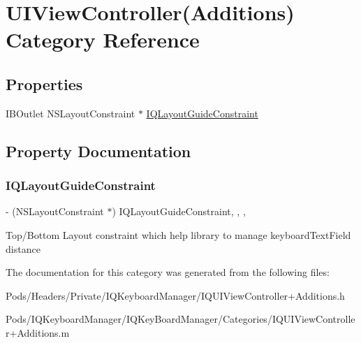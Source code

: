\hypertarget{category_u_i_view_controller_07_additions_08}{}\section{U\+I\+View\+Controller(Additions) Category Reference}
\label{category_u_i_view_controller_07_additions_08}
\subsection*{Properties}
\begin{DoxyCompactItemize}
\item 
I\+B\+Outlet N\+S\+Layout\+Constraint $\ast$ \mbox{\hyperlink{category_u_i_view_controller_07_additions_08_a039dc064ed9ab5ee7c542b3663229952}{I\+Q\+Layout\+Guide\+Constraint}}
\end{DoxyCompactItemize}


\subsection{Property Documentation}
\mbox{\label{category_u_i_view_controller_07_additions_08_a039dc064ed9ab5ee7c542b3663229952}} 
\subsubsection{\texorpdfstring{I\+Q\+Layout\+Guide\+Constraint}{IQLayoutGuideConstraint}}
{\footnotesize\ttfamily -\/ (N\+S\+Layout\+Constraint $\ast$) I\+Q\+Layout\+Guide\+Constraint\hspace{0.3cm}{\ttfamily [read]}, {\ttfamily [write]}, {\ttfamily [nonatomic]}, {\ttfamily [strong]}}

Top/\+Bottom Layout constraint which help library to manage keyboard\+Text\+Field distance 

The documentation for this category was generated from the following files\+:\begin{DoxyCompactItemize}
\item 
Pods/\+Headers/\+Private/\+I\+Q\+Keyboard\+Manager/I\+Q\+U\+I\+View\+Controller+\+Additions.\+h\item 
Pods/\+I\+Q\+Keyboard\+Manager/\+I\+Q\+Key\+Board\+Manager/\+Categories/I\+Q\+U\+I\+View\+Controller+\+Additions.\+m\end{DoxyCompactItemize}
